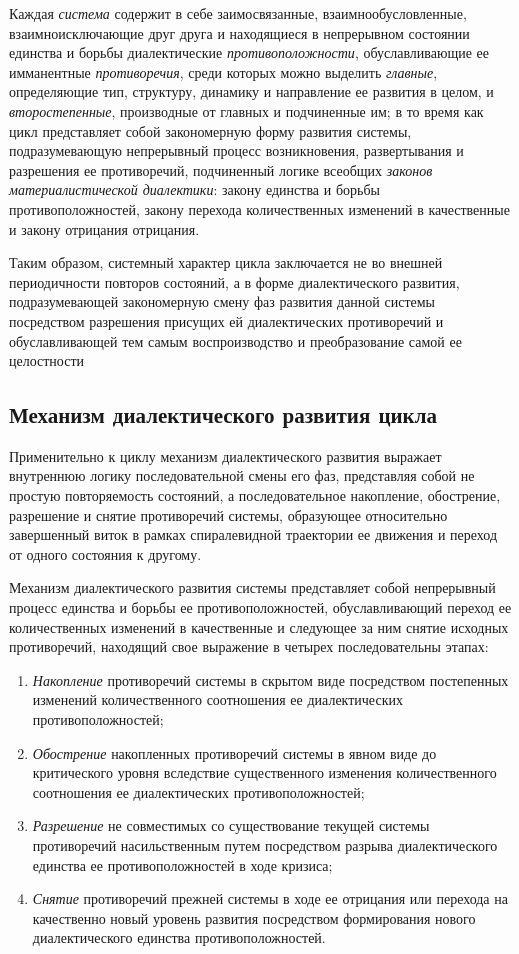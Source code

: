 Каждая \textit{система} содержит в себе заимосвязанные, взаимнообусловленные, взаимноисключающие друг друга и находящиеся в непрерывном состоянии единства и борьбы диалектические \textit{противоположности}, обуславливающие ее имманентные \textit{противоречия}, среди которых можно выделить \textit{главные}, определяющие тип, структуру, динамику и направление ее развития в целом, и \textit{второстепенные}, производные от главных и подчиненные им; в то время как цикл представляет собой закономерную форму развития системы, подразумевающую непрерывный процесс возникновения, развертывания и разрешения ее противоречий, подчиненный логике всеобщих \textit{законов материалистической диалектики}: закону единства и борьбы противоположностей, закону перехода количественных изменений в качественные и закону отрицания отрицания.

Таким образом, системный характер цикла заключается не во внешней периодичности повторов состояний, а в форме диалектического развития, подразумевающей закономерную смену фаз развития данной системы посредством разрешения присущих ей диалектических противоречий и обуславливающей тем самым воспроизводство и преобразование самой ее целостности

\subsection{Механизм диалектического развития цикла}
Применительно к циклу механизм диалектического развития выражает внутреннюю логику последовательной смены его фаз, представляя собой не простую повторяемость состояний, а последовательное накопление, обострение, разрешение и снятие противоречий системы, образующее относительно завершенный виток в рамках спиралевидной траектории ее движения и переход от одного состояния к другому.

Механизм диалектического развития системы представляет собой непрерывный процесс единства и борьбы ее противоположностей, обуславливающий переход ее количественных изменений в качественные и следующее за ним снятие исходных противоречий, находящий свое выражение в четырех последовательны этапах:
\begin{enumerate}
    \item \textit{Накопление} противоречий системы в скрытом виде посредством постепенных изменений количественного соотношения ее диалектических противоположностей;
    \item \textit{Обострение} накопленных противоречий системы в явном виде до критического уровня вследствие существенного изменения количественного соотношения ее диалектических противоположностей;
    \item \textit{Разрешение} не совместимых со существование текущей системы противоречий насильственным путем посредством разрыва диалектического единства ее противоположностей в ходе кризиса;
    \item \textit{Снятие} противоречий прежней системы в ходе ее отрицания или перехода на качественно новый уровень развития посредством формирования нового диалектического единства противоположностей.
\end{enumerate}

